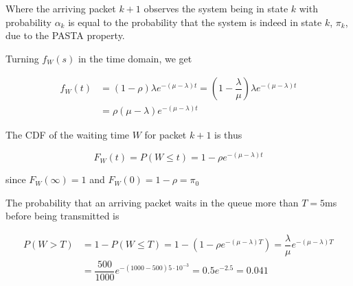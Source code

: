 Where the arriving packet $k+1$ observes the system being in state $k$ with
probability $\alpha_k$ is equal to the probability that the system is indeed in
state $k$, $\pi_k$, due to the PASTA property.

Turning $f_W(s)$ in the time domain, we get

\begin{align*}
  f_W(t) &= (1-\rho) \lambda e^{-(\mu - \lambda)t} = (1-\dfrac{\lambda}{\mu}) \lambda e^{-(\mu - \lambda)t} \\
         &= \rho(\mu - \lambda) e^{-(\mu - \lambda)t}
\end{align*}

The CDF of the waiting time $W$ for packet $k+1$ is thus

$$F_W(t) = P(W \leq t) = 1 - \rho e^{-(\mu - \lambda)t}$$

since $F_W(\infty) = 1$ and $F_W(0) = 1-\rho = \pi_0$

The probability that an arriving packet waits in the queue more than $T = 5$ms
before being transmitted is

\begin{align*}
  P(W > T) &= 1 - P(W \leq T) = 1- (1-\rho e^{-(\mu - \lambda)T}) = \dfrac{\lambda}{\mu}e^{-(\mu - \lambda)T} \\
           &= \dfrac{500}{1000} e^{-(1000 - 500) 5 \cdot 10^{-3}} = 0.5 e^{-2.5} = 0.041
\end{align*}
